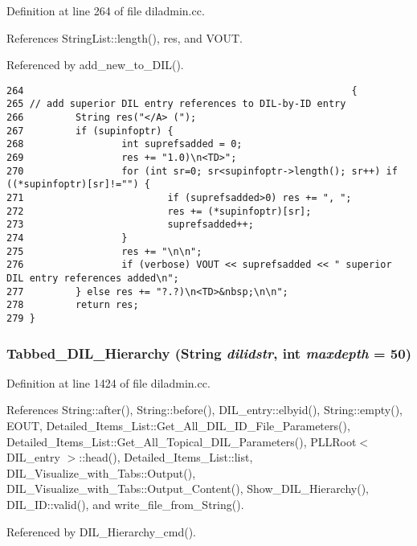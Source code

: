 Definition at line 264 of file diladmin.cc.

References String\-List::length(), res, and VOUT.

Referenced by add\_\-new\_\-to\_\-DIL().



\footnotesize\begin{verbatim}264                                                         {
265 // add superior DIL entry references to DIL-by-ID entry
266         String res("</A> (");
267         if (supinfoptr) {
268                 int suprefsadded = 0;
269                 res += "1.0)\n<TD>";
270                 for (int sr=0; sr<supinfoptr->length(); sr++) if ((*supinfoptr)[sr]!="") {
271                         if (suprefsadded>0) res += ", ";
272                         res += (*supinfoptr)[sr];
273                         suprefsadded++;
274                 }
275                 res += "\n\n";
276                 if (verbose) VOUT << suprefsadded << " superior DIL entry references added\n";
277         } else res += "?.?)\n<TD>&nbsp;\n\n";
278         return res;
279 }
\end{verbatim}\normalsize 
{}
\subsubsection{ Tabbed\_\-DIL\_\-Hierarchy ({\bf String} {\em dilidstr}, int {\em maxdepth} = 50)}\label{diladmin_8cc_a21}




Definition at line 1424 of file diladmin.cc.

References String::after(), String::before(), DIL\_\-entry::elbyid(), String::empty(), EOUT, Detailed\_\-Items\_\-List::Get\_\-All\_\-DIL\_\-ID\_\-File\_\-Parameters(), Detailed\_\-Items\_\-List::Get\_\-All\_\-Topical\_\-DIL\_\-Parameters(), PLLRoot$<$ DIL\_\-entry $>$::head(), Detailed\_\-Items\_\-List::list, DIL\_\-Visualize\_\-with\_\-Tabs::Output(), DIL\_\-Visualize\_\-with\_\-Tabs::Output\_\-Content(), Show\_\-DIL\_\-Hierarchy(), DIL\_\-ID::valid(), and write\_\-file\_\-from\_\-String().

Referenced by DIL\_\-Hierarchy\_\-cmd().



